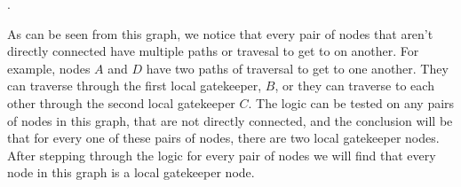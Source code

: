 \documentclass[11pt]{article}
\begin{document}
{\begin{enumerate}
\begin{enumerate}[(a)]
\begin{center}
.
	\end{center}
As can be seen from this graph, we notice that every pair of nodes that aren't directly connected have multiple paths or travesal to get to on another.  For example, nodes $A$ and $D$ have two paths of traversal to get to one another.  They can traverse through the first local gatekeeper, $B$, or they can traverse to each other through the second local gatekeeper $C$.  The logic can be tested on any pairs of nodes in this graph, that are not directly connected, and the conclusion will be that for every one of these pairs of nodes, there are two local gatekeeper nodes.  After stepping through the logic for every pair of nodes we will find that every node in this graph is a local gatekeeper node.
	\end{enumerate}
\end{enumerate}
}
\end{document}
